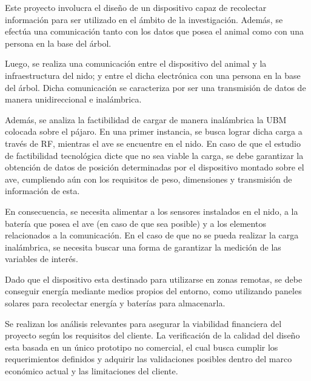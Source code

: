 Este proyecto involucra el diseño de un dispositivo capaz de recolectar información para ser utilizado en el ámbito de la investigación. Además, se efectúa una comunicación tanto con los datos que posea el animal como con una persona en la base del árbol.

Luego, se realiza una comunicación entre el dispositivo del animal y la infraestructura del nido; y entre el dicha electrónica con una persona en la base del árbol. Dicha comunicación se caracteriza por ser una transmisión de datos de manera unidireccional e inalámbrica.

Además, se analiza la factibilidad de cargar de manera inalámbrica la UBM colocada sobre el pájaro. En una primer instancia, se busca lograr dicha carga a través de RF, mientras el ave se encuentre en el nido. En caso de que el estudio de factibilidad tecnológica dicte que no sea viable la carga, se debe garantizar la obtención de datos de posición determinadas por el dispositivo montado sobre el ave, cumpliendo aún con los requisitos de peso, dimensiones y transmisión de información de esta.

En consecuencia, se necesita alimentar a los sensores instalados en el nido, a la batería que posea el ave (en caso de que sea posible) y a los elementos relacionados a la comunicación. En el caso de que no se pueda realizar la carga inalámbrica, se necesita buscar una forma de garantizar la medición de las variables de interés.

Dado que el dispositivo esta destinado para utilizarse en zonas remotas, se debe conseguir energía mediante medios propios del entorno, como utilizando paneles solares para recolectar energía y baterías para almacenarla.

Se realizan los análisis relevantes para asegurar la viabilidad financiera del proyecto según los requisitos del cliente. La verificación de la calidad del diseño esta basada en un único prototipo no comercial, el cual busca cumplir los requerimientos definidos y adquirir las validaciones posibles dentro del marco económico actual y las limitaciones del cliente. 

